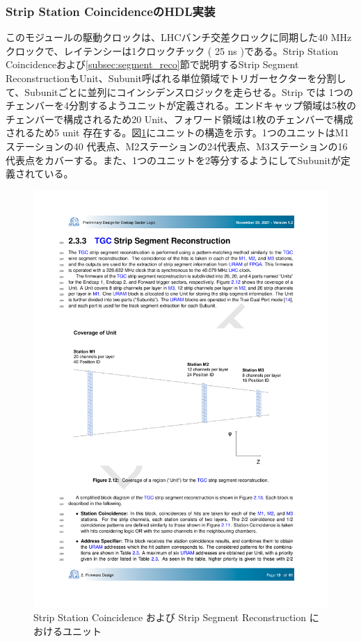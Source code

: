 \subsubsection*{Strip Station CoincidenceのHDL実装}
このモジュールの駆動クロックは、LHCバンチ交差クロックに同期した40 MHzクロックで、レイテンシーは1クロックチック ( 25 ns )である。Strip Station Coincidenceおよび\ref{subsec:segment_reco}節で説明するStrip Segment ReconstructionもUnit、Subunit呼ばれる単位領域でトリガーセクターを分割して、Subunitごとに並列にコインシデンスロジックを走らせる。Strip では 1つのチェンバーを4分割するようユニットが定義される。エンドキャップ領域は5枚のチェンバーで構成されるため20 Unit、フォワード領域は1枚のチェンバーで構成されるため5 unit 存在する。図\ref{StationCoin_unit_strip}にユニットの構造を示す。1つのユニットはM1ステーションの40 代表点、M2ステーションの24代表点、M3ステーションの16代表点をカバーする。また、1つのユニットを2等分するようにしてSubunitが定義されている。

\begin{figure} 
    \centering
    \includegraphics[width=16cm]{fig/SL/StationCoin_unit_strip.pdf}
    \caption[Strip Station Coincidence および Strip Segment Reconstruction におけるユニット]{Strip Station Coincidence および Strip Segment Reconstruction におけるユニット}
    \label{StationCoin_unit_strip}
\end{figure}

